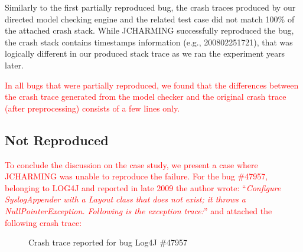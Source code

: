 \documentclass[times, doublespace]{smrauth}
\newcommand{\red}[1]{\textcolor{red}{#1}}
\begin{document}
Similarly to the first partially reproduced bug, the crash traces produced by our
directed model checking engine and the related test case did not match 100\% of
the attached crash stack.
While JCHARMING successfully reproduced the bug, the crash stack contains
timestamps information (e.g., 200802251721),
that was logically different in our produced stack trace as we ran the experiment
years later.

\red{In all bugs that were partially reproduced, we found that the
differences between the crash trace generated from the model
checker and the original crash trace (after preprocessing)
consists of a few lines only.}

\subsection{Not Reproduced}

\red{To conclude the discussion on the case study, we present a
case where JCHARMING was unable to reproduce the failure.
For the bug \#47957, belonging to LOG4J and reported in late
2009 the author wrote: ``{\it Configure SyslogAppender with a Layout class that does not
exist; it throws a NullPointerException. Following is the
exception trace:}'' and attached the following crash trace:}

\begin{figure}[H]

\noindent{}

\caption{Crash trace reported for bug Log4J \#47957\label{fig:log4j}}
\end{figure}
\end{document}
